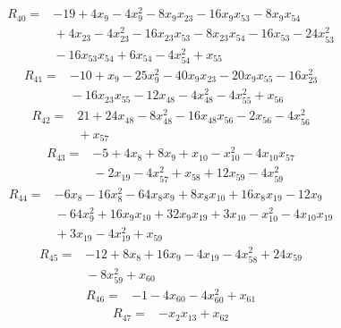 {%
\begin{align*}
R_{40} ={}& -19 + 4x_{9} - 4x_{9}^{2} - 8x_{9} x_{23} - 16x_{9} x_{53} - 8x_{9} x_{54} \\
&{}  + 4x_{23} - 4x_{23}^{2} - 16x_{23} x_{53} - 8x_{23} x_{54} - 16x_{53} - 24x_{53}^{2} \\
&{}  - 16x_{53} x_{54} + 6x_{54} - 4x_{54}^{2} + x_{55}
\end{align*}
\begin{align*}
R_{41} ={}& -10 + x_{9} - 25x_{9}^{2} - 40x_{9} x_{23} - 20x_{9} x_{55} - 16x_{23}^{2} \\
&{}  - 16x_{23} x_{55} - 12x_{48} - 4x_{48}^{2} - 4x_{55}^{2} + x_{56}
\end{align*}
\begin{align*}
R_{42} ={}& 21 + 24x_{48} - 8x_{48}^{2} - 16x_{48} x_{56} - 2x_{56} - 4x_{56}^{2} \\
&{}  + x_{57}
\end{align*}
\begin{align*}
R_{43} ={}& -5 + 4x_{8} + 8x_{9} + x_{10} - x_{10}^{2} - 4x_{10} x_{57} \\
&{}  - 2x_{19} - 4x_{57}^{2} + x_{58} + 12x_{59} - 4x_{59}^{2}
\end{align*}
\begin{align*}
R_{44} ={}& -6x_{8} - 16x_{8}^{2} - 64x_{8} x_{9} + 8x_{8} x_{10} + 16x_{8} x_{19} - 12x_{9} \\
&{}  - 64x_{9}^{2} + 16x_{9} x_{10} + 32x_{9} x_{19} + 3x_{10} - x_{10}^{2} - 4x_{10} x_{19} \\
&{}  + 3x_{19} - 4x_{19}^{2} + x_{59}
\end{align*}
\begin{align*}
R_{45} ={}& -12 + 8x_{8} + 16x_{9} - 4x_{19} - 4x_{58}^{2} + 24x_{59} \\
&{}  - 8x_{59}^{2} + x_{60}
\end{align*}
\begin{align*}
R_{46} ={}& -1 - 4x_{60} - 4x_{60}^{2} + x_{61}
\end{align*}
\begin{align*}
R_{47} ={}& -x_{2} x_{13} + x_{62}
\end{align*}
\begin{align*}

\end{align*}}
